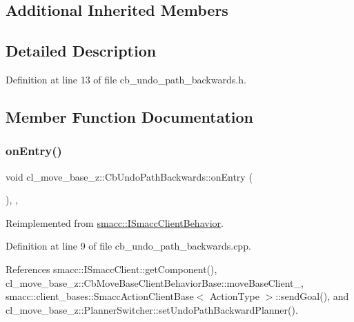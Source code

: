 \subsection*{Additional Inherited Members}


\subsection{Detailed Description}


Definition at line 13 of file cb\+\_\+undo\+\_\+path\+\_\+backwards.\+h.



\subsection{Member Function Documentation}
\mbox{\label{classcl__move__base__z_1_1CbUndoPathBackwards_a32e680530375b62c7053bf173f6b2b1b}} 
\subsubsection{\texorpdfstring{on\+Entry()}{onEntry()}}
{\footnotesize\ttfamily void cl\+\_\+move\+\_\+base\+\_\+z\+::\+Cb\+Undo\+Path\+Backwards\+::on\+Entry (\begin{DoxyParamCaption}{ }\end{DoxyParamCaption})\hspace{0.3cm}{\ttfamily [override]}, {\ttfamily [private]}, {\ttfamily [virtual]}}



Reimplemented from \hyperlink{classsmacc_1_1ISmaccClientBehavior_a9877684b1954429719826e2d0924d980}{smacc\+::\+I\+Smacc\+Client\+Behavior}.



Definition at line 9 of file cb\+\_\+undo\+\_\+path\+\_\+backwards.\+cpp.



References smacc\+::\+I\+Smacc\+Client\+::get\+Component(), cl\+\_\+move\+\_\+base\+\_\+z\+::\+Cb\+Move\+Base\+Client\+Behavior\+Base\+::move\+Base\+Client\+\_\+, smacc\+::client\+\_\+bases\+::\+Smacc\+Action\+Client\+Base$<$ Action\+Type $>$\+::send\+Goal(), and cl\+\_\+move\+\_\+base\+\_\+z\+::\+Planner\+Switcher\+::set\+Undo\+Path\+Backward\+Planner().


